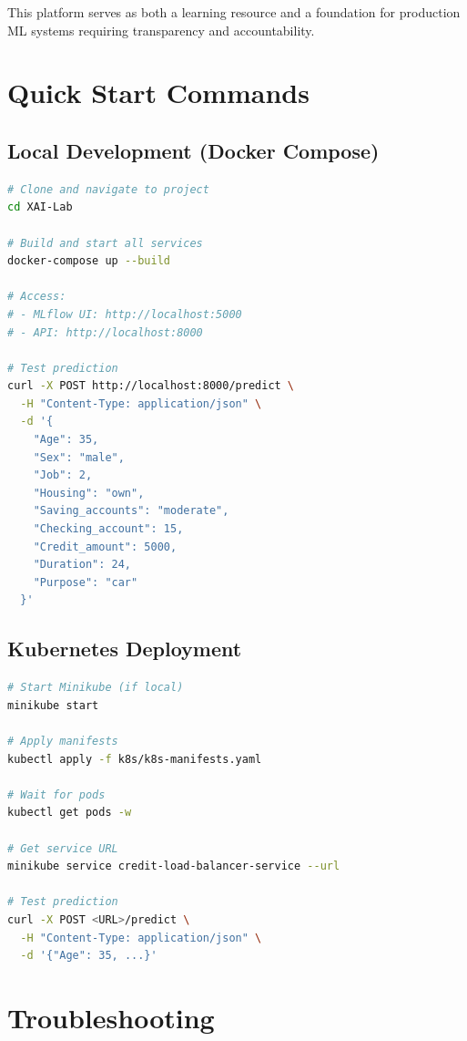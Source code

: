 \documentclass[11pt,a4paper]{article}
\begin{document}
This platform serves as both a learning resource and a foundation for production ML systems requiring transparency and accountability.

\appendix

\section{Quick Start Commands}

\subsection{Local Development (Docker Compose)}
\begin{lstlisting}[language=bash, style=yamlstyle]
# Clone and navigate to project
cd XAI-Lab

# Build and start all services
docker-compose up --build

# Access:
# - MLflow UI: http://localhost:5000
# - API: http://localhost:8000

# Test prediction
curl -X POST http://localhost:8000/predict \
  -H "Content-Type: application/json" \
  -d '{
    "Age": 35,
    "Sex": "male",
    "Job": 2,
    "Housing": "own",
    "Saving_accounts": "moderate",
    "Checking_account": 15,
    "Credit_amount": 5000,
    "Duration": 24,
    "Purpose": "car"
  }'
\end{lstlisting}

\subsection{Kubernetes Deployment}
\begin{lstlisting}[language=bash, style=yamlstyle]
# Start Minikube (if local)
minikube start

# Apply manifests
kubectl apply -f k8s/k8s-manifests.yaml

# Wait for pods
kubectl get pods -w

# Get service URL
minikube service credit-load-balancer-service --url

# Test prediction
curl -X POST <URL>/predict \
  -H "Content-Type: application/json" \
  -d '{"Age": 35, ...}'
\end{lstlisting}

\section{Troubleshooting}
\end{document}
